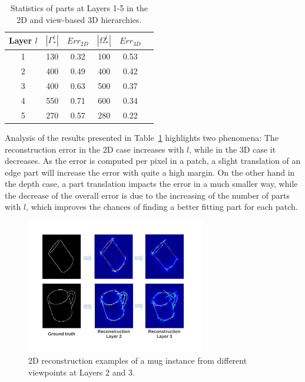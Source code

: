 \documentclass[runningheads]{llncs}
\begin{document}
 \begin{table}
 \begin{center}
  \begin{tabular}{ | c | c | c | c | c |r |}
      \hline
      Layer $l$  & $|\Gamma_*^l|$ & $Err_{2D}$ &  $|\Omega_*^l|$ & $Err_{3D}$ \\ \hline
    1 &  130 & 0.32 & 100 & 0.53 \\ \hline
    2 &  400 & 0.49 & 400 & 0.42 \\ \hline
    3 &  400 & 0.63 & 500 & 0.37  \\ \hline 
    4 &  550 & 0.71 & 600 & 0.34  \\ \hline
    5 &  270 & 0.57 & 280 & 0.22 \\ \hline
  \end{tabular}
\end{center}
 \caption{Statistics of parts at Layers 1-5 in the 2D and view-based 3D hierarchies.}
 \label{tab:stats}
\end{table}

Analysis of the results presented in Table~\ref{tab:stats} highlights two phenomena: The reconstruction error in the 2D case increases with $l$, while in the 3D case it decreases. As the error is computed per pixel in a patch, a slight translation of an edge part will increase the error with quite a high margin. On the other hand in the depth case, a part translation impacts the error in a much smaller way, while the decrease of the overall error is due to the increasing of the number of parts with $l$, which improves the chances of finding a better fitting part for each patch. 

\begin{figure}
\begin{center}
\includegraphics[width=0.7\textwidth]{reconstruction_edge}
\end{center}
\caption{2D reconstruction examples of a mug instance from different viewpoints at Layers 2 and 3.}
\label{reconstructionEdge}
\end{figure}
\end{document}
